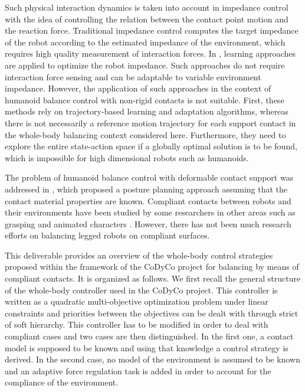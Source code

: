 \documentclass[12pt,a4paper,twoside]{article}
\begin{document}
Such physical interaction dynamics is taken into account in impedance control \cite{Hogan85} with the idea of controlling the relation between the contact point motion and the reaction force. Traditional impedance control \cite{Hogan85,Love95,Tsumugiwa02} computes the target impedance of the robot according to the estimated impedance of the environment, which requires high quality measurement of interaction forces. In \cite{Buchli10, Yang11}, learning approaches are applied to optimize the robot impedance. Such approaches do not require interaction force sensing and can be adaptable to variable environment impedance. However, the application of such approaches in the context of humanoid balance control with non-rigid contacts is not suitable. First, these methods rely on trajectory-based learning and adaptation algorithms, whereas there is not necessarily a reference motion trajectory for each support contact in the whole-body balancing context considered here. Furthermore, they need to explore the entire state-action space if a globally optimal solution is to be found, which is impossible for high dimensional robots such as humanoids.

The problem of humanoid balance control with deformable contact support was addressed in \cite{Bouyarmane11b}, which proposed a posture planning approach assuming that the contact material properties are known. Compliant contacts between robots and their environments have been studied by some researchers in other areas such as grasping \cite{Xydes&Kao99} and animated characters \cite{Jain&Liu11}. However, there has not been much research efforts on balancing legged robots on compliant surfaces.

This deliverable provides an overview of the whole-body control strategies proposed within the framework of the CoDyCo project for balancing by means of compliant contacts. It is organized as follows. We first recall the general structure of the whole-body controller used in the CoDyCo project. This controller is written as a quadratic multi-objective optimization problem under linear constraints and priorities between the objectives can be dealt with through strict of soft hierarchy. This controller has to be modified in order to deal with compliant cases and two cases are then distinguished. In the first one, a contact model is supposed to be known and using that knowledge a control strategy is derived. In the second case, no model of the environment is assumed to be known and an adaptive force regulation task is added in order to account for the compliance of the environment.
\end{document}
